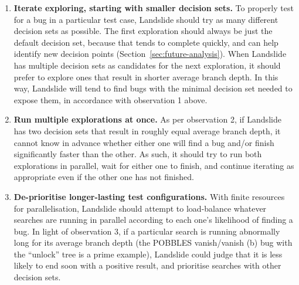 \begin{enumerate}
	\item {\bf Iterate exploring, starting with smaller decision sets.} To properly test for a bug in a particular test case, Landslide should try as many different decision sets as possible.
	The first exploration should always be just the default decision set, because that tends to complete quickly, and can help identify new decision points (Section~\ref{sec:future-analysis}).
	When Landslide has multiple decision sets as candidates for the next exploration, it should prefer to explore ones that result in shorter average branch depth.
	In this way, Landslide will tend to find bugs with the minimal decision set needed to expose them, in accordance with observation 1 above.
	\item {\bf Run multiple explorations at once.}
	As per observation 2, if Landslide has two decision sets that result in roughly equal average branch depth, it cannot know in advance whether either one will find a bug and/or finish significantly faster than the other. As such, it should try to run both explorations in parallel, wait for either one to finish, and continue iterating as appropriate even if the other one has not finished.
	\item {\bf De-prioritise longer-lasting test configurations.}
	With finite resources for parallelisation, Landslide should attempt to load-balance whatever searches are running in parallel according to each one's likelihood of finding a bug.
	In light of observation 3, if a particular search is running abnormally long for its average branch depth (the POBBLES vanish/vanish (b) bug with the ``unlock'' tree is a prime example), Landslide could judge that it is less likely to end soon with a positive result, and prioritise searches with other decision sets.
\end{enumerate}

